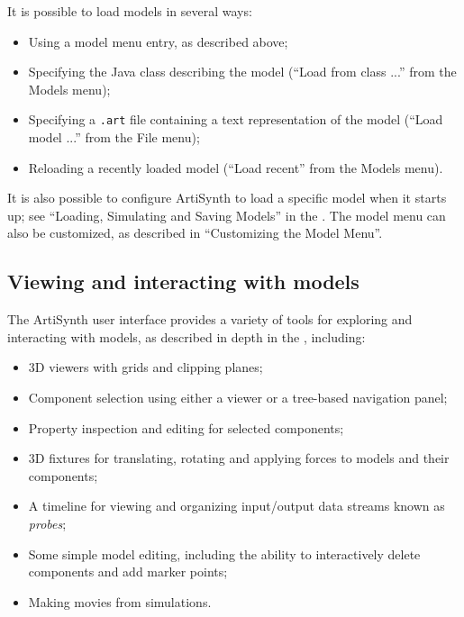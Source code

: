 It is possible to load models in several ways:

\begin{itemize}

\item Using a model menu entry, as described above;

\item Specifying the Java class describing the model
({\sf ``Load from class ...''} from the {\sf Models} menu);

\item Specifying a {\tt .art} file containing a text
representation of the model ({\sf ``Load model ...''} from the {\sf
File} menu);

\item Reloading a recently loaded model 
({\sf ``Load recent''} from the {\sf Models} menu).

\end{itemize}

It is also possible to configure ArtiSynth to load a specific model
when it starts up; see ``Loading, Simulating and Saving Models'' in the
.
The model menu can also be customized, as described in ``Customizing
the Model Menu''.

\subsection{Viewing and interacting with models}

The ArtiSynth user interface provides a variety of tools for exploring
and interacting with models, as described in depth in
the ,
including:

\begin{itemize}

\item 3D viewers with grids and clipping planes;

\item Component selection using either a viewer or
a tree-based navigation panel;

\item Property inspection and editing for selected components;

\item 3D fixtures for translating, rotating and
applying forces to models and their components;

\item A timeline for viewing and organizing input/output data streams
known as {\it probes};

\item Some simple model editing, including the ability to interactively
delete components and add marker points;

\item Making movies from simulations.

\end{itemize}

